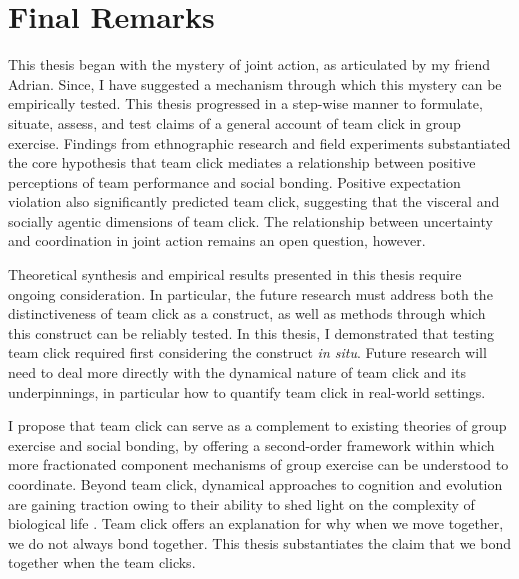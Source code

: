 


    \section{Final Remarks}

  This thesis began with the mystery of joint action, as articulated by my friend Adrian.  Since, I have suggested a mechanism through which this mystery can be empirically tested. This thesis progressed in a step-wise manner to formulate, situate, assess, and test claims of a general account of team click in group exercise.  Findings from ethnographic research and field experiments substantiated the core hypothesis that team click mediates a relationship between positive perceptions of team performance and social bonding.  Positive expectation violation also significantly predicted team click, suggesting that the visceral and socially agentic dimensions of team click.  The relationship between uncertainty and coordination in joint action remains an open question, however.

  Theoretical synthesis and empirical results presented in this thesis require ongoing consideration.  In particular, the future research must address both the distinctiveness of team click as a construct, as well as methods through which this construct can be reliably tested.  In this thesis, I demonstrated that testing team click required first considering the construct \textit{in situ}.  Future research will need to deal more directly with the dynamical nature of team click and its underpinnings, in particular how to quantify team click in real-world settings.

  I propose that team click can serve as a complement to existing theories of group exercise and social bonding, by offering a second-order framework within which more fractionated component mechanisms of group exercise can be understood to coordinate.  Beyond team click, dynamical approaches to cognition and evolution are gaining traction owing to their ability to shed light on the complexity of biological life \citep{Ramstead2017,Badcock2012}.  Team click offers an explanation for why when we move together, we do not  always bond together.  This thesis substantiates the claim that we bond together when the team clicks.
